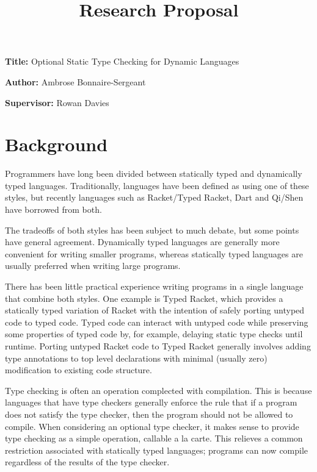 \documentclass[12pt, a4paper]{article}
\title{Research Proposal}
\author{}
\date{}
\newcommand{\namelistlabel}[1]{\mbox{#1}\hfil}
\newenvironment{namelist}[1]{%
\begin{list}{}
    {
        \let\makelabel\namelistlabel
        \settowidth{\labelwidth}{#1}
        \setlength{\leftmargin}{1.1\labelwidth}
    }
  }{%
\end{list}}
\begin{document}
\maketitle

\begin{namelist}{xxxxxxxxxxxx}
\item[{\bf Title:}]
	Optional Static Type Checking for Dynamic Languages
\item[{\bf Author:}]
	Ambrose Bonnaire-Sergeant
\item[{\bf Supervisor:}]
	Rowan Davies
\end{namelist}

\section*{Background} 


Programmers have long been divided between statically typed and 
dynamically typed languages.
Traditionally, languages have been defined as using one of these styles,
but recently languages such as Racket/Typed Racket, Dart and Qi/Shen
have borrowed from both.

The tradeoffs of both styles has been subject to much debate, but some
points have general agreement. Dynamically typed languages
are generally more convenient for writing smaller 
programs, whereas statically typed languages are usually preferred 
when writing large programs.

There has been little practical experience writing programs in a single
language that combine both styles.  One example is
Typed Racket, which provides a statically typed variation of Racket 
with the intention of safely porting untyped code to typed code. 
Typed code can interact with untyped code while preserving some properties
of typed code by, for example, delaying static type checks until runtime.
Porting untyped Racket code to Typed Racket generally involves 
adding type annotations to top level declarations with minimal (usually zero)
modification to existing code structure.

Type checking is often an operation complected with compilation. This is
because languages that have type checkers generally enforce the rule that
if a program does not satisfy the type checker, then the program should not be 
allowed to compile. When considering an optional type checker, it makes sense
to provide type checking as a simple operation, callable a la carte. 
This relieves a common restriction associated with statically typed languages;
programs can now compile regardless of the results of the 
type checker.
\end{document}
